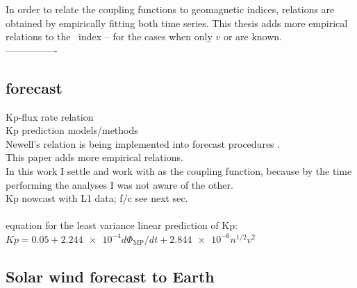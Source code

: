 In order to relate the coupling functions to geomagnetic indices, relations are obtained by empirically fitting both time series. This thesis adds more empirical relations to the \Kp~index -- for the cases when only $v$ or \vBz{} are known.\\




----------------\\
\subsection{\Kp{} forecast}

Kp-flux rate relation\\
Kp prediction models/methods\\
Newell's relation is being implemented into forecast procedures \citep{Savani2017}.\\

This paper adds more empirical relations.\\
In this work I settle and work with \vBz{} as the coupling function, because by the time performing the analyses I was not aware of the other.\\

Kp nowcast with L1 data; f/c see next sec.\\

\citet{Newell2008}\\
equation for the least variance linear prediction of Kp: $Kp = 0.05 + \num{2.244e-4} d\Phi_\text{MP}/dt + \num{2.844e-6} n^{1/2} v^2$\\



\subsection{Solar wind forecast to Earth}








%
%
%



